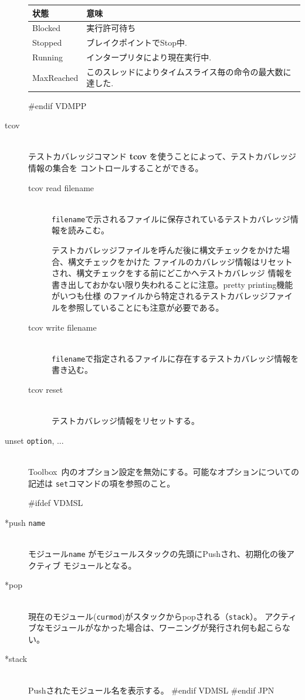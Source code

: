 \documentclass[\pformat,12pt]{article}
\newcommand{\Toolbox}{Toolbox}
\newcommand{\Toolbox}{Toolbox}
\begin{document}
\begin{description}
\begin{tabular}{lp{10cm}}\hline
状態 & 意味 \\ \hline
Blocked    & 実行許可待ち \\ 
Stopped    & ブレイクポイントでStop中.\\
Running    & インタープリタにより現在実行中. \\
MaxReached & このスレッドによりタイムスライス毎の命令の最大数に達した. \\ \hline 
\end{tabular}
#endif VDMPP

\item[tcov]\mbox{}\\
テストカバレッジコマンド {\bf tcov} を使うことによって、テストカバレッジ情報の集合を
コントロールすることができる。

  \begin{description}
  \item[tcov read filename]\mbox{}\\
    {\tt filename}で示されるファイルに保存されているテストカバレッジ情報を読みこむ。

    テストカバレッジファイルを呼んだ後に構文チェックをかけた場合、構文チェックをかけた
    ファイルのカバレッジ情報はリセットされ、構文チェックをする前にどこかへテストカバレッジ
    情報を書き出しておかない限り失われることに注意。pretty printing機能がいつも仕様
    のファイルから特定されるテストカバレッジファイルを参照していることにも注意が必要である。

  \item[tcov write filename]\mbox{} \\
    {\tt filename}で指定されるファイルに存在するテストカバレッジ情報を書き込む。
  
  \item[tcov reset]\mbox{} \\
    テストカバレッジ情報をリセットする。
  \end{description}

\item[unset {\tt option}, ...]\mbox{}\\
  \Toolbox\ 内のオプション設定を無効にする。可能なオプションについての記述は
  {\tt set}コマンドの項を参照のこと。

#ifdef VDMSL
\item[*push {\tt name}] \mbox{}\\
  モジュール{\tt name} がモジュールスタックの先頭にPushされ、初期化の後アクティブ
  モジュールとなる。

\item[*pop] \mbox{}\\
 現在のモジュール({\tt curmod})がスタックからpopされる（{\tt stack}）。
 アクティブなモジュールがなかった場合は、ワーニングが発行され何も起こらない。

\item[*stack]\mbox{}\\
  Pushされたモジュール名を表示する。
#endif VDMSL
#endif JPN
\end{description}
\end{document}
